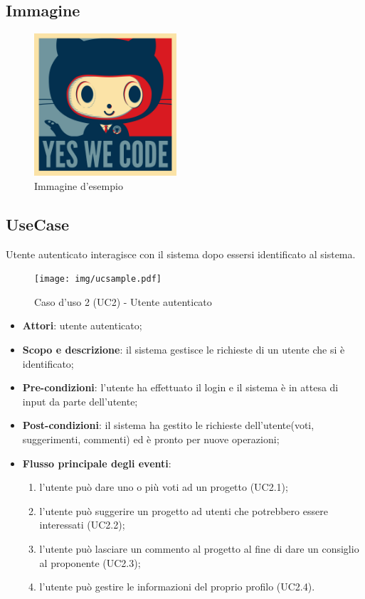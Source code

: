 \subsection{Immagine}
\begin{figure}[H]
\centering %
\includegraphics[width=200px]{img/example.png}
\caption{Immagine d'esempio}
\label{fig:immagine esempio}
\end{figure}

\subsection{UseCase}
Utente autenticato interagisce con il sistema dopo essersi identificato al sistema.
\begin{figure}[H]
  \centering  
  \texttt{[image: img/ucsample.pdf]}
  \caption{Caso d'uso 2 (UC2) - Utente autenticato}\label{fig:uc_utente_loggato} 
\end{figure}
\begin{itemize}
	\item \textbf{Attori}: utente autenticato;
	\item \textbf{Scopo e descrizione}: il sistema gestisce le richieste di un utente che si è identificato; 
	\item \textbf{Pre-condizioni}: l'utente ha effettuato il login e il sistema è in attesa di input da parte dell'utente;
	\item \textbf{Post-condizioni}: il sistema ha gestito le richieste dell'utente(voti, suggerimenti, commenti) ed è pronto per nuove operazioni;
	\item \textbf{Flusso principale degli eventi}:
		\begin{enumerate}
		\item l'utente può dare uno o più voti ad un progetto (UC2.1);
		\item l'utente può suggerire un progetto ad utenti che potrebbero essere interessati (UC2.2);
		\item l'utente può lasciare un commento al progetto al fine di dare un consiglio al proponente (UC2.3);
		\item l'utente può gestire le informazioni del proprio profilo (UC2.4).
		\end{enumerate}
\end{itemize}